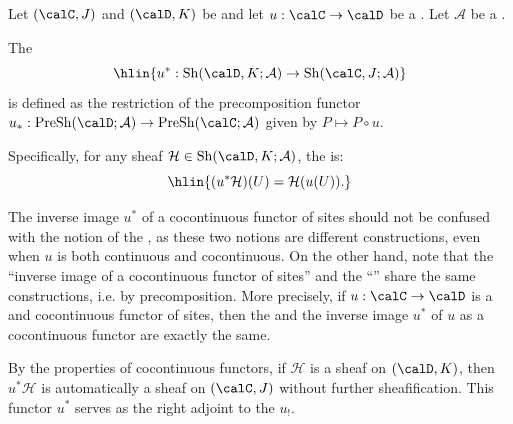 \begin{definition} \label{definition:inverse_image_of_sheaves_along_a_cocontinuous_functor_of_sites}
Let $(\calC,J)$ and $(\calD,K)$ be  and let $u : \calC \to \calD$ be a .  Let $\mathcal{A}$ be a . 

The 
$$\hlin{u^* : \operatorname{Sh}(\calD,K;\mathcal{A}) \to \operatorname{Sh}(\calC,J;\mathcal{A})}$$
is defined as the restriction of the precomposition functor $u_* : \operatorname{PreSh}(\calD; \mathcal{A}) \to \operatorname{PreSh}(\calC; \mathcal{A})$ given by $P \mapsto P \circ u$. 

Specifically, for any sheaf $\mathcal{H} \in \operatorname{Sh}(\calD,K;\mathcal{A})$, the  is:
$$\hlin{(u^* \mathcal{H})(U) = \mathcal{H}(u(U)).}$$

The inverse image $u^*$ of a cocontinuous functor of sites should not be confused with the notion of the , as these two notions are different constructions, even when $u$ is both continuous and cocontinuous. On the other hand, note that the ``inverse image of a cocontinuous functor of sites'' and the ``'' share the same constructions, i.e. by precomposition. More precisely, if $u: \calC \to \calD$ is a  and cocontinuous functor of sites, then the  and the inverse image $u^*$ of $u$ as a cocontinuous functor are exactly the same.

By the properties of cocontinuous functors, if $\mathcal{H}$ is a sheaf on $(\calD, K)$, then $u^* \mathcal{H}$ is automatically a sheaf on $(\calC, J)$ without further sheafification. This functor $u^*$ serves as the right adjoint to the  $u_!$.
\end{definition}